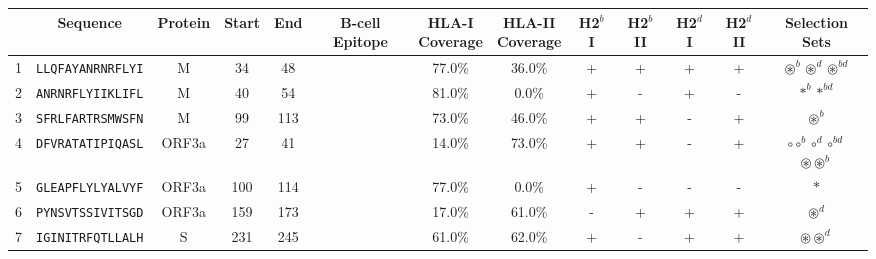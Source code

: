 \begin{tabular}{rcccccccccccc}
\toprule
{} &                  Sequence & Protein &  Start &   End & B-cell Epitope & \Centerstack{HLA-I \\ Coverage} & \Centerstack{HLA-II \\ Coverage} & H2$^{b}$ I & H2$^{b}$ II & H2$^{d}$ I & H2$^{d}$ II &                                                                         Selection Sets \\
\midrule
1  &  \texttt{LLQFAYANRNRFLYI} &       M &     34 &    48 &                &                          77.0\% &                           36.0\% &          + &           + &          + &           + &                                       $ \circledast^b \circledast^d \circledast^{bd} $ \\
2  &  \texttt{ANRNRFLYIIKLIFL} &       M &     40 &    54 &                &                          81.0\% &                            0.0\% &          + &           - &          + &           - &                                                                   $ \ast^b \ast^{bd} $ \\
3  &  \texttt{SFRLFARTRSMWSFN} &       M &     99 &   113 &                &                          73.0\% &                           46.0\% &          + &           + &          - &           + &                                                                      $ \circledast^b $ \\
4  &  \texttt{DFVRATATIPIQASL} &   ORF3a &     27 &    41 &                &                          14.0\% &                           73.0\% &          + &           + &          - &           + &    \Centerstack{  $\circ \circ^b \circ^d \circ^{bd}$ \\  $\circledast \circledast^b$ } \\
5  &  \texttt{GLEAPFLYLYALVYF} &   ORF3a &    100 &   114 &                &                          77.0\% &                            0.0\% &          + &           - &          - &           - &                                                                               $ \ast $ \\
6  &  \texttt{PYNSVTSSIVITSGD} &   ORF3a &    159 &   173 &                &                          17.0\% &                           61.0\% &          - &           + &          + &           + &                                                                      $ \circledast^d $ \\
7  &  \texttt{IGINITRFQTLLALH} &       S &    231 &   245 &                &                          61.0\% &                           62.0\% &          + &           - &          + &           + &                                                          $ \circledast \circledast^d $ \\

\end{tabular}
